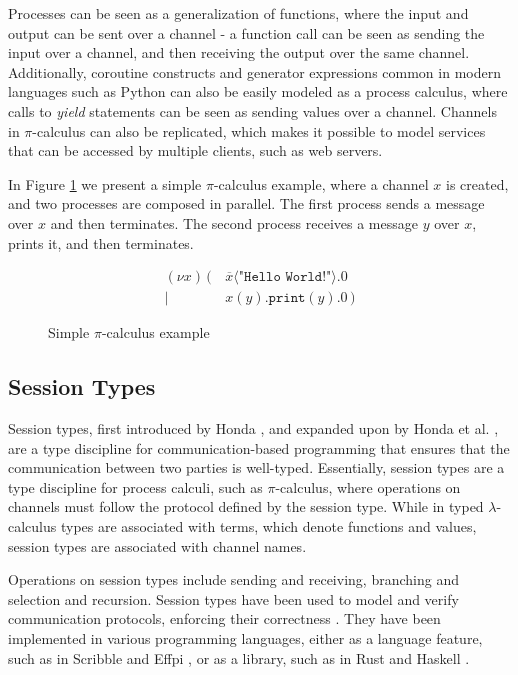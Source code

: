 Processes can be seen as a generalization of functions, where the input and output can be sent over a channel - a function call can be seen as sending the input over a channel, and then receiving the output over the same channel. Additionally, coroutine constructs and generator expressions common in modern languages such as Python can also be easily modeled as a process calculus, where calls to \textit{yield} statements can be seen as sending values over a channel. Channels in $\pi$-calculus can also be replicated, which makes it possible to model services that can be accessed by multiple clients, such as web servers.

In Figure \ref{fig:PiCalculusExample} we present a simple $\pi$-calculus example, where a channel $x$ is created, and two processes are composed in parallel. The first process sends a message over $x$ and then terminates. The second process receives a message $y$ over $x$, prints it, and then terminates.

\begin{figure}[H]
    \centering
    \begin{align*}
        (\nu x)\,(\, & \overline{x}\langle\texttt{"Hello World!"}\rangle.0 \\
        |\           & x(y).\texttt{print}(y).0\,)
    \end{align*}
    \caption{Simple $\pi$-calculus example}
    \label{fig:PiCalculusExample}
\end{figure}


\subsection{Session Types}

Session types, first introduced by Honda \cite{Honda:1993}, and expanded upon by Honda et al. \cite{Honda:1998}, are a type discipline for communication-based programming that ensures that the communication between two parties is well-typed. Essentially, session types are a type discipline for process calculi, such as $\pi$-calculus, where operations on channels must follow the protocol defined by the session type. While in typed $\lambda$-calculus types are associated with terms, which denote functions and values, session types are associated with channel names.

Operations on session types include sending and receiving, branching and selection and recursion. Session types have been used to model and verify communication protocols, enforcing their correctness \cite{Huttel:2016}. They have been implemented in various programming languages, either as a language feature, such as in Scribble \cite{Yoshida:2014} and Effpi \cite{Scalas:2019}, or as a library, such as in Rust \cite{Jespersen:2015} and Haskell \cite{Pucella:2008}.


